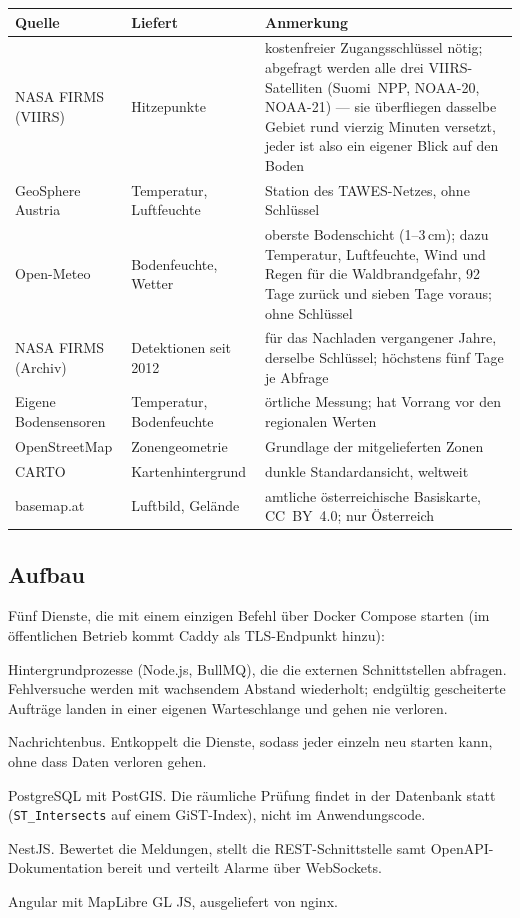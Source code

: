 \documentclass[11pt,a4paper,DIV=12,parskip=half]{scrartcl}
\begin{document}
\begin{center}
\begin{tabularx}{\textwidth}{@{}l l X@{}}
\toprule
\textbf{Quelle} & \textbf{Liefert} & \textbf{Anmerkung} \\
\midrule
NASA FIRMS (VIIRS) & Hitzepunkte & kostenfreier Zugangsschlüssel nötig;
abgefragt werden alle drei VIIRS-Satelliten (Suomi~NPP, NOAA-20, NOAA-21) ---
sie überfliegen dasselbe Gebiet rund vierzig Minuten versetzt, jeder ist also
ein eigener Blick auf den Boden \\
GeoSphere Austria & Temperatur, Luftfeuchte & Station des TAWES-Netzes,
ohne Schlüssel \\
Open-Meteo & Bodenfeuchte, Wetter & oberste Bodenschicht (1--3\,cm);
dazu Temperatur, Luftfeuchte, Wind und Regen für die Waldbrandgefahr, 92 Tage
zurück und sieben Tage voraus; ohne Schlüssel \\
NASA FIRMS (Archiv) & Detektionen seit 2012 & für das Nachladen vergangener
Jahre, derselbe Schlüssel; höchstens fünf Tage je Abfrage \\
Eigene Bodensensoren & Temperatur, Bodenfeuchte & örtliche Messung; hat
Vorrang vor den regionalen Werten \\
OpenStreetMap & Zonengeometrie & Grundlage der mitgelieferten Zonen \\
CARTO & Kartenhintergrund & dunkle Standardansicht, weltweit \\
basemap.at & Luftbild, Gelände & amtliche österreichische Basiskarte,
CC~BY~4.0; nur Österreich \\
\bottomrule
\end{tabularx}
\end{center}

\subsection{Aufbau}

Fünf Dienste, die mit einem einzigen Befehl über Docker Compose starten (im
öffentlichen Betrieb kommt Caddy als TLS-Endpunkt hinzu):

\begin{description}[leftmargin=0pt, style=nextline, itemsep=2pt]
  \item[workers] Hintergrundprozesse (Node.js, BullMQ), die die externen
    Schnittstellen abfragen. Fehlversuche werden mit wachsendem Abstand
    wiederholt; endgültig gescheiterte Aufträge landen in einer eigenen
    Warteschlange und gehen nie verloren.
  \item[redis] Nachrichtenbus. Entkoppelt die Dienste, sodass jeder einzeln
    neu starten kann, ohne dass Daten verloren gehen.
  \item[db] PostgreSQL mit PostGIS. Die räumliche Prüfung findet in der
    Datenbank statt (\texttt{ST\_Intersects} auf einem GiST-Index), nicht im
    Anwendungscode.
  \item[backend] NestJS. Bewertet die Meldungen, stellt die REST-Schnittstelle
    samt OpenAPI-Dokumentation bereit und verteilt Alarme über WebSockets.
  \item[frontend] Angular mit MapLibre GL JS, ausgeliefert von nginx.
\end{description}
\end{document}
